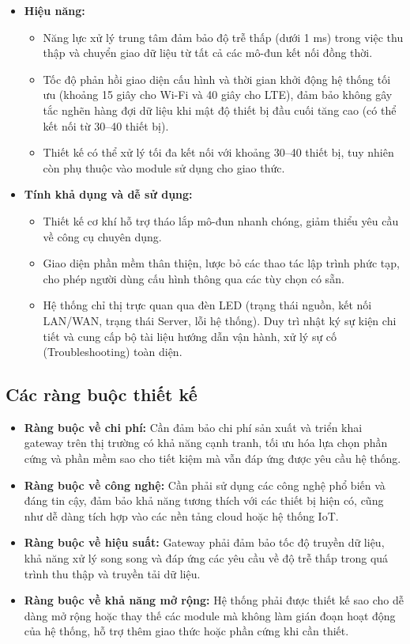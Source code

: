 \begin{itemize}
            \item \textbf{Hiệu năng:}
            \begin{itemize}
                \item Năng lực xử lý trung tâm đảm bảo độ trễ thấp (dưới 1 ms) trong việc thu thập và chuyển giao dữ liệu từ tất cả các mô-đun kết nối đồng thời.
                \item Tốc độ phản hồi giao diện cấu hình và thời gian khởi động hệ thống tối ưu (khoảng 15 giây cho Wi-Fi và 40 giây cho LTE), đảm bảo không gây tắc nghẽn hàng đợi dữ liệu khi mật độ thiết bị đầu cuối tăng cao (có thể kết nối từ 30--40 thiết bị).
                \item Thiết kế có thể xử lý tối đa kết nối với khoảng 30--40 thiết bị, tuy nhiên còn phụ thuộc vào module sử dụng cho giao thức.
            \end{itemize}
            
            \item \textbf{Tính khả dụng và dễ sử dụng:}
            \begin{itemize}
                \item Thiết kế cơ khí hỗ trợ tháo lắp mô-đun nhanh chóng, giảm thiểu yêu cầu về công cụ chuyên dụng.
                \item Giao diện phần mềm thân thiện, lược bỏ các thao tác lập trình phức tạp, cho phép người dùng cấu hình thông qua các tùy chọn có sẵn.
                \item Hệ thống chỉ thị trực quan qua đèn LED (trạng thái nguồn, kết nối LAN/WAN, trạng thái Server, lỗi hệ thống). Duy trì nhật ký sự kiện chi tiết và cung cấp bộ tài liệu hướng dẫn vận hành, xử lý sự cố (Troubleshooting) toàn diện.
            \end{itemize}
        \end{itemize}

    \subsection{Các ràng buộc thiết kế}
        \begin{itemize}
            \item \textbf{Ràng buộc về chi phí:} Cần đảm bảo chi phí sản xuất và triển khai gateway trên thị trường có khả năng cạnh tranh, tối ưu hóa lựa chọn phần cứng và phần mềm sao cho tiết kiệm mà vẫn đáp ứng được yêu cầu hệ thống.
            \item \textbf{Ràng buộc về công nghệ:} Cần phải sử dụng các công nghệ phổ biến và đáng tin cậy, đảm bảo khả năng tương thích với các thiết bị hiện có, cũng như dễ dàng tích hợp vào các nền tảng cloud hoặc hệ thống IoT.
            \item \textbf{Ràng buộc về hiệu suất:} Gateway phải đảm bảo tốc độ truyền dữ liệu, khả năng xử lý song song và đáp ứng các yêu cầu về độ trễ thấp trong quá trình thu thập và truyền tải dữ liệu.
            \item \textbf{Ràng buộc về khả năng mở rộng:} Hệ thống phải được thiết kế sao cho dễ dàng mở rộng hoặc thay thế các module mà không làm gián đoạn hoạt động của hệ thống, hỗ trợ thêm giao thức hoặc phần cứng khi cần thiết.
        \end{itemize}